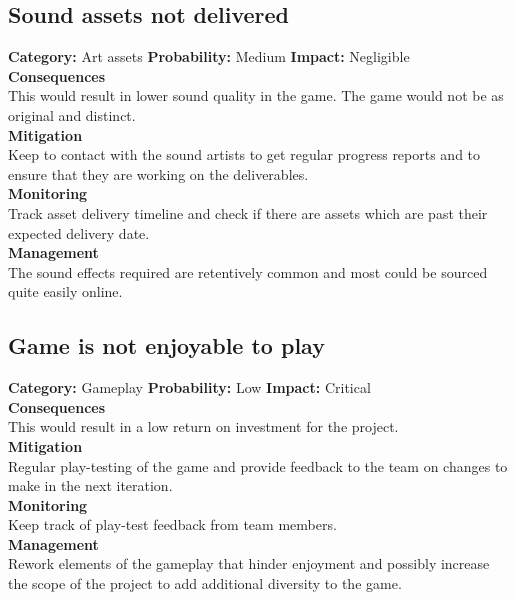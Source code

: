 \documentclass[a4paper,10pt]{article}
\begin{document}
\subsection{Sound assets not delivered}
\textbf{Category:} Art assets\newline
\textbf{Probability:} Medium\newline
\textbf{Impact:} Negligible
\\\textbf{Consequences}\\
This would result in lower sound quality in the game.
The game would not be as original and distinct.
\smallskip\\\textbf{Mitigation}\\
Keep to contact with the sound artists to get regular progress reports and to ensure that they are working on the deliverables.
\smallskip\\\textbf{Monitoring}\\
Track asset delivery timeline and check if there are assets which are past their expected delivery date.
\smallskip\\\textbf{Management}\\
The sound effects required are retentively common and most could be sourced quite easily online.

\subsection{Game is not enjoyable to play}
\textbf{Category:} Gameplay\newline
\textbf{Probability:} Low\newline
\textbf{Impact:} Critical
\\\textbf{Consequences}\\
This would result in a low return on investment for the project.
\smallskip\\\textbf{Mitigation}\\
Regular play-testing of the game and provide feedback to the team on changes to make in the next iteration.
\smallskip\\\textbf{Monitoring}\\
Keep track of play-test feedback from team members.
\smallskip\\\textbf{Management}\\
Rework elements of the gameplay that hinder enjoyment and possibly increase the scope of the project to add additional diversity to the game. 
\end{document}
